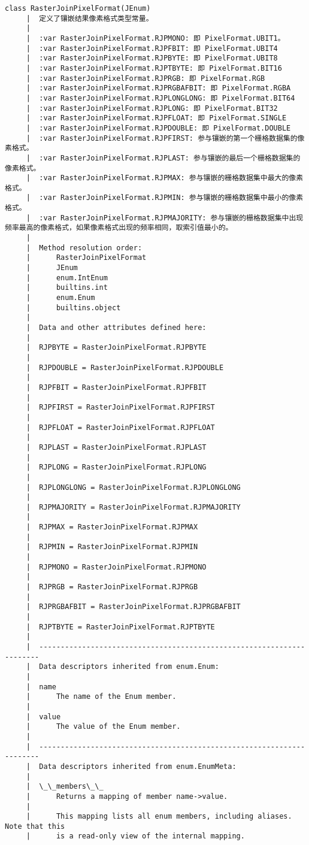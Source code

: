 \documentclass[11pt]{article}
\begin{document}
\begin{Verbatim}[commandchars=\\\{\}]
    class RasterJoinPixelFormat(JEnum)
     |  定义了镶嵌结果像素格式类型常量。
     |  
     |  :var RasterJoinPixelFormat.RJPMONO: 即 PixelFormat.UBIT1。
     |  :var RasterJoinPixelFormat.RJPFBIT: 即 PixelFormat.UBIT4
     |  :var RasterJoinPixelFormat.RJPBYTE: 即 PixelFormat.UBIT8
     |  :var RasterJoinPixelFormat.RJPTBYTE: 即 PixelFormat.BIT16
     |  :var RasterJoinPixelFormat.RJPRGB: 即 PixelFormat.RGB
     |  :var RasterJoinPixelFormat.RJPRGBAFBIT: 即 PixelFormat.RGBA
     |  :var RasterJoinPixelFormat.RJPLONGLONG: 即 PixelFormat.BIT64
     |  :var RasterJoinPixelFormat.RJPLONG: 即 PixelFormat.BIT32
     |  :var RasterJoinPixelFormat.RJPFLOAT: 即 PixelFormat.SINGLE
     |  :var RasterJoinPixelFormat.RJPDOUBLE: 即 PixelFormat.DOUBLE
     |  :var RasterJoinPixelFormat.RJPFIRST: 参与镶嵌的第一个栅格数据集的像素格式。
     |  :var RasterJoinPixelFormat.RJPLAST: 参与镶嵌的最后一个栅格数据集的像素格式。
     |  :var RasterJoinPixelFormat.RJPMAX: 参与镶嵌的栅格数据集中最大的像素格式。
     |  :var RasterJoinPixelFormat.RJPMIN: 参与镶嵌的栅格数据集中最小的像素格式。
     |  :var RasterJoinPixelFormat.RJPMAJORITY: 参与镶嵌的栅格数据集中出现频率最高的像素格式，如果像素格式出现的频率相同，取索引值最小的。
     |  
     |  Method resolution order:
     |      RasterJoinPixelFormat
     |      JEnum
     |      enum.IntEnum
     |      builtins.int
     |      enum.Enum
     |      builtins.object
     |  
     |  Data and other attributes defined here:
     |  
     |  RJPBYTE = RasterJoinPixelFormat.RJPBYTE
     |  
     |  RJPDOUBLE = RasterJoinPixelFormat.RJPDOUBLE
     |  
     |  RJPFBIT = RasterJoinPixelFormat.RJPFBIT
     |  
     |  RJPFIRST = RasterJoinPixelFormat.RJPFIRST
     |  
     |  RJPFLOAT = RasterJoinPixelFormat.RJPFLOAT
     |  
     |  RJPLAST = RasterJoinPixelFormat.RJPLAST
     |  
     |  RJPLONG = RasterJoinPixelFormat.RJPLONG
     |  
     |  RJPLONGLONG = RasterJoinPixelFormat.RJPLONGLONG
     |  
     |  RJPMAJORITY = RasterJoinPixelFormat.RJPMAJORITY
     |  
     |  RJPMAX = RasterJoinPixelFormat.RJPMAX
     |  
     |  RJPMIN = RasterJoinPixelFormat.RJPMIN
     |  
     |  RJPMONO = RasterJoinPixelFormat.RJPMONO
     |  
     |  RJPRGB = RasterJoinPixelFormat.RJPRGB
     |  
     |  RJPRGBAFBIT = RasterJoinPixelFormat.RJPRGBAFBIT
     |  
     |  RJPTBYTE = RasterJoinPixelFormat.RJPTBYTE
     |  
     |  ----------------------------------------------------------------------
     |  Data descriptors inherited from enum.Enum:
     |  
     |  name
     |      The name of the Enum member.
     |  
     |  value
     |      The value of the Enum member.
     |  
     |  ----------------------------------------------------------------------
     |  Data descriptors inherited from enum.EnumMeta:
     |  
     |  \_\_members\_\_
     |      Returns a mapping of member name->value.
     |      
     |      This mapping lists all enum members, including aliases. Note that this
     |      is a read-only view of the internal mapping.
    

\end{Verbatim}
\end{document}
